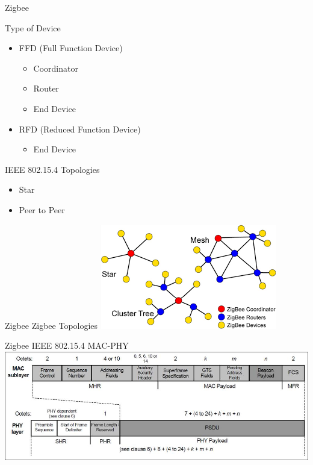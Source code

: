 \documentclass[serif,Blue]{beamer}
\begin{document}
\begin{frame}{Zigbee}
	\begin{block}{Type of Device}
		\begin{itemize}\justifying{}
			\item FFD (Full Function Device)
			\begin{itemize}\justifying{}
				\item Coordinator
				\item Router
				\item End Device
			\end{itemize}
			\item RFD (Reduced Function Device)
			\begin{itemize}\justifying{}
				\item End Device
			\end{itemize}
		\end{itemize}
	\end{block}
	\begin{block}{IEEE 802.15.4 Topologies}
		\begin{itemize}\justifying{}
			\item Star
			\item Peer to Peer
		\end{itemize}
	\end{block}
\end{frame}

\begin{frame}{Zigbee}
	Zigbee Topologies
	\center\includegraphics[scale=.7]{img/ztopo.png}
\end{frame}

\begin{frame}{Zigbee}
	IEEE 802.15.4 MAC-PHY
	\center\includegraphics[scale=.4]{img/154frame.jpg}
\end{frame}
\end{document}
